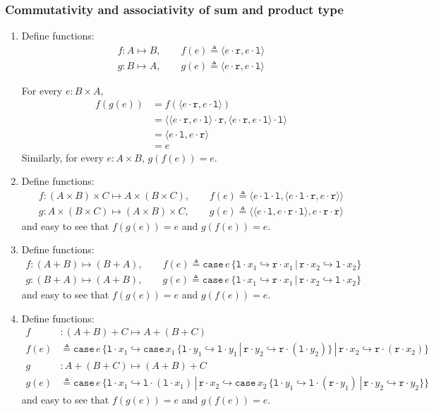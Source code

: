 \documentclass{article}
\theoremstyle{definition}
\newcommand{\ip}[1]{\langle #1 \rangle}
\newcommand{\lp}{\cdot \mathtt{l}}
\newcommand{\rp}{\cdot \mathtt{r}}
\newcommand{\li}{\mathtt{l}\cdot}
\newcommand{\ri}{\mathtt{r}\cdot}
\newcommand{\case}[5]{\mathtt{case}\, #1\, \{\li #2\hookrightarrow #3\, |\, \ri #4\hookrightarrow #5\}}
\begin{document}
\subsubsection*{Commutativity and associativity of sum and product type}
\begin{enumerate}
    \item Define functions:
          \begin{align*}
              f:A \mapsto B,\qquad f(e)\triangleq \ip{e\rp, e\lp} \\
              g:B \mapsto A,\qquad g(e)\triangleq \ip{e\rp, e\lp}
          \end{align*}

          For every $e: B\times A$,
          \begin{align*}
              f(g(e)) & = f(\ip{e\rp,e\lp})                         \\
                      & = \ip{\ip{e\rp,e\lp}\rp, \ip{e\rp,e\lp}\lp} \\
                      & = \ip{e\lp, e\rp}                           \\
                      & = e
          \end{align*}
          Similarly, for every $e: A\times B$, $g(f(e)) = e$.
    \item Define functions:
          \begin{align*}
              f:(A\times B)\times C \mapsto A\times (B\times C),\qquad f(e)\triangleq \ip{e\lp\lp,\ip{e\lp\rp,e\rp}} \\
              g:A\times (B\times C) \mapsto (A\times B)\times C,\qquad g(e)\triangleq \ip{\ip{e\lp, e\rp\lp},e\rp\rp}
          \end{align*}
          and easy to see that $f(g(e)) = e$ and $g(f(e)) = e$.
    \item Define functions:
          \begin{align*}
              f:(A+B)\mapsto (B+A),\qquad f(e)\triangleq \case{e}{x_1}{\ri x_1}{x_2}{\li x_2} \\
              g:(B+A)\mapsto (A+B),\qquad g(e)\triangleq \case{e}{x_1}{\ri x_1}{x_2}{\li x_2}
          \end{align*}
          and easy to see that $f(g(e)) = e$ and $g(f(e)) = e$.
    \item Define functions:
          \begin{align*}
              f    & :(A+B)+ C \mapsto A+(B+C)                                                                 \\
              f(e) & \triangleq \case{e}{x_1}{\case{x_1}{y_1}{\li y_1}{y_2}{\ri (\li y_2)}}{x_2}{\ri(\ri x_2)} \\
              g    & :A+(B+C) \mapsto (A+B)+ C                                                                 \\
              g(e) & \triangleq \case{e}{x_1}{\li(\li x_1)}{x_2}{\case{x_2}{y_1}{\li (\ri y_1)}{y_2}{\ri y_2}}
          \end{align*}
          and easy to see that $f(g(e)) = e$ and $g(f(e)) = e$.
\end{enumerate}
\end{document}
